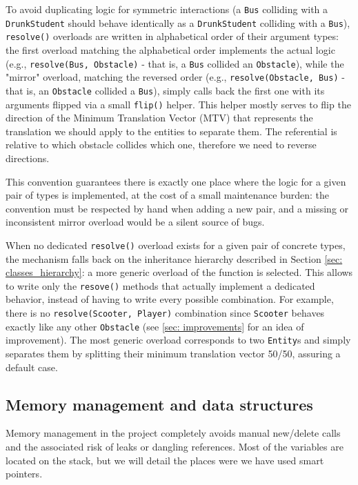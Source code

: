 \documentclass{article}
\begin{document}
To avoid duplicating logic for symmetric interactions (a \texttt{Bus} colliding with a \texttt{DrunkStudent} should behave identically as a \texttt{DrunkStudent} colliding with a \texttt{Bus}), \texttt{resolve()} overloads are written in alphabetical order of their argument types: the first overload matching the alphabetical order implements the actual logic (e.g., \texttt{resolve(Bus, Obstacle)} - that is, a \texttt{Bus} collided an \texttt{Obstacle}), while the "mirror" overload, matching the reversed order (e.g., \texttt{resolve(Obstacle, Bus)} - that is, an \texttt{Obstacle} collided a \texttt{Bus}), simply calls back the first one with its arguments flipped via a small \texttt{flip()} helper. 
This helper mostly serves to flip the direction of the Minimum Translation Vector (MTV) that represents the translation we should apply to the entities to separate them. The referential is relative to which obstacle collides which one, therefore we need to reverse directions.

This convention guarantees there is exactly one place where the logic for a given pair of types is implemented, at the cost of a small maintenance burden: the convention must be respected by hand when adding a new pair, and a missing or inconsistent mirror overload would be a silent source of bugs.

When no dedicated \texttt{resolve()} overload exists for a given pair of concrete types, the mechanism falls back on the inheritance hierarchy described in Section \ref{sec: classes_hierarchy}: a more generic overload of the function is selected. This allows to write only the \texttt{resove()} methods that actually implement a dedicated behavior, instead of having to write every possible combination. For example, there is no \texttt{resolve(Scooter, Player)} combination since \texttt{Scooter} behaves exactly like any other \texttt{Obstacle} (see \ref{sec: improvements} for an idea of improvement). The most generic overload corresponds to two \texttt{Entity}s and simply separates them by splitting their minimum translation vector 50/50, assuring a default case.

\subsection{Memory management and data structures} \label{sec: memory_management}

Memory management in the project completely avoids manual new/delete calls and the associated risk of leaks or dangling references. Most of the variables are located on the stack, but we will detail the places were we have used smart pointers.
\end{document}
